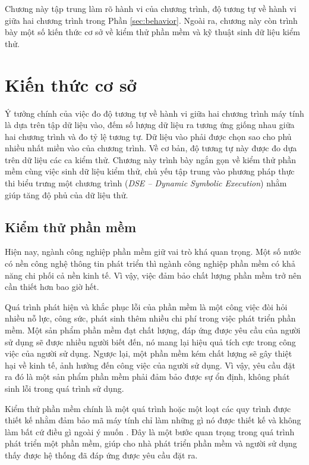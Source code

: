 Chương này tập trung làm rõ hành vi của chương trình, độ tương tự về
hành vi giữa hai chương trình trong Phần \ref{sec:behavior}. Ngoài ra, 
chương này còn trình bày một số kiến thức cơ sở về kiểm thử phần mềm và 
kỹ thuật sinh dữ liệu kiểm thử.
\section{Kiến thức cơ sở}
\label{sec:base}

Ý tưởng chính của việc đo độ tương tự về hành vi giữa hai chương trình
máy tính là dựa trên tập dữ liệu vào, đếm số lượng dữ liệu ra tương
ứng giống nhau giữa hai chương trình và đo tỷ lệ tương tự. Dữ liệu vào
phải được chọn sao cho phủ nhiều nhất miền vào của chương trình. Về cơ
bản, độ tương tự này được đo dựa trên dữ liệu các ca kiểm thử. Chương
này trình bày ngắn gọn về kiểm thử phần mềm cùng việc sinh dữ liệu
kiểm thử, chủ yếu tập trung vào phương pháp thực thi biểu trưng một
chương trình (\emph{DSE -- Dynamic Symbolic Execution}) nhằm giúp 
tăng độ phủ của dữ liệu thử.

\subsection{Kiểm thử phần mềm}
Hiện nay, ngành công nghiệp phần mềm giữ vai trò khá quan trọng. Một
số nước có nền công nghệ thông tin phát triển thì ngành công nghiệp
phần mềm có khả năng chi phối cả nền kinh tế. Vì vậy, việc đảm bảo
chất lượng phần mềm trở nên cần thiết hơn bao giờ hết.

Quá trình phát hiện và khắc phục lỗi của phần mềm là một công việc đòi 
hỏi nhiều nỗ lực, công sức, phát sinh thêm nhiều chi phí trong việc phát 
triển phần mềm. Một sản phẩm phần mềm đạt chất lượng, đáp ứng được yêu 
cầu của người sử dụng sẽ được nhiều người biết đến, nó mang lại hiệu quả 
tích cực trong công việc của người sử dụng. Ngược lại, một phần mềm kém 
chất lượng sẽ gây thiệt hại về kinh tế, ảnh hưởng đến công việc của người 
sử dụng. Vì vậy, yêu cầu đặt ra đó là một sản phẩm phần mềm phải đảm bảo 
được sự ổn định, không phát sinh lỗi trong quá trình sử dụng.

Kiểm thử phần mềm chính là một quá trình hoặc một loạt các quy trình
được thiết kế nhằm đảm bảo mã máy tính chỉ làm những gì nó được thiết
kế và không làm bất cứ điều gì ngoài ý muốn \cite{myers2011art}. Đây
là một bước quan trọng trong quá trình phát triển một phần mềm, giúp
cho nhà phát triển phần mềm và người sử dụng thấy được hệ thống đã đáp
ứng được yêu cầu đặt ra.


